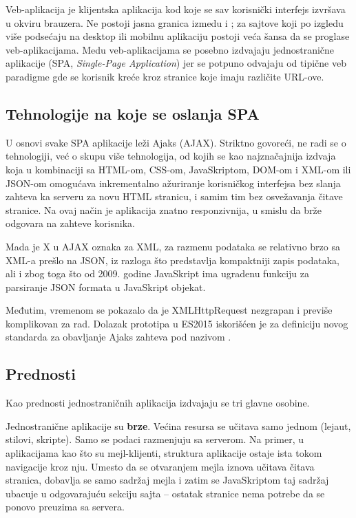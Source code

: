 Veb-aplikacija je klijentska aplikacija kod koje se sav korisnički interfejs izvršava u okviru brauzera.
Ne postoji jasna granica izmedu  i ; za sajtove koji po izgledu više podsećaju na desktop ili mobilnu aplikaciju postoji veća šansa da se proglase veb-aplikacijama.
Medu veb-aplikacijama se posebno izdvajaju jednostranične aplikacije (SPA, \textsl{Single-Page Application}) jer se potpuno odvajaju od tipične veb paradigme gde se korisnik kreće kroz stranice koje imaju različite URL-ove.

\subsection{Tehnologije na koje se oslanja SPA}

U osnovi svake SPA aplikacije leži Ajaks (AJAX).
Striktno govoreći, ne radi se o tehnologiji, već o skupu više tehnologija, od kojih se kao najznačajnija izdvaja  koja u kombinaciji sa HTML-om, CSS-om, JavaSkriptom, DOM-om i XML-om ili JSON-om omogućava inkrementalno ažuriranje korisničkog interfejsa bez slanja zahteva ka serveru za novu HTML stranicu, i samim tim bez osvežavanja čitave stranice.
Na ovaj način je aplikacija znatno responzivnija, u smislu da brže odgovara na zahteve korisnika.

Mada je X u AJAX oznaka za XML, za razmenu podataka se relativno brzo sa XML-a prešlo na JSON, iz razloga što predstavlja kompaktniji zapis podataka, ali
i zbog toga što od 2009. godine JavaSkript ima ugradenu funkciju za parsiranje JSON formata u JavaSkript objekat.

Međutim, vremenom se pokazalo da je XMLHttpRequest nezgrapan i previše komplikovan za rad.
Dolazak prototipa  u ES2015 iskorišćen je za definiciju novog standarda za obavljanje Ajaks zahteva pod nazivom .

\subsection{Prednosti}

Kao prednosti jednostraničnih aplikacija izdvajaju se tri glavne osobine.

Jednostranične aplikacije su \textbf{brze}.
Većina resursa se učitava samo jednom (lejaut, stilovi, skripte).
Samo se podaci razmenjuju sa serverom.
Na primer, u aplikacijama kao što su mejl-klijenti, struktura aplikacije ostaje ista tokom navigacije kroz nju.
Umesto da se otvaranjem mejla iznova učitava čitava stranica, dobavlja se samo sadržaj mejla i zatim se JavaSkriptom taj sadržaj ubacuje u odgovarajuću sekciju sajta -- ostatak stranice nema potrebe da se ponovo preuzima sa servera.

